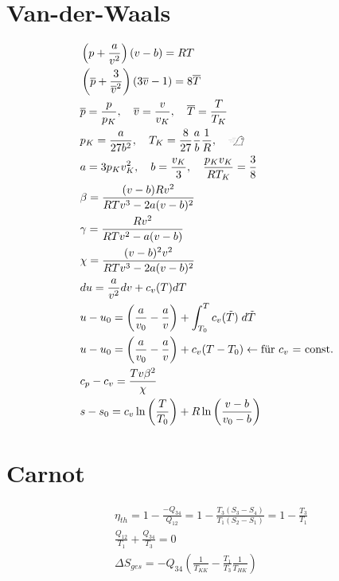 \documentclass[twocolumn]{article}
\begin{document}
\section{Van-der-Waals}
\begin{align*}
	&\left(p + \frac{a}{v^2}\right)(v-b) = RT \\
	&\left(\overline{p} + \frac{3}{\overline{v}^2}\right)(3\overline{v}-1) = 8\overline{T} \\
	&\overline{p} = \frac{p}{p_K}, \quad \overline{v} = \frac{v}{v_K}, \quad \overline{T} = \frac{T}{T_K} \\
	&p_K = \frac{a}{27b^2}, \quad T_K = \frac{8}{27}\frac{a}{b}\frac{1}{R}, \quad \xrightswishingghost{} \\
	&a=3p_Kv^2_K, \quad b =\frac{v_K}{3}, \quad \frac{p_Kv_K}{RT_K} = \frac{3}{8} \\
	&\beta = \frac{(v-b)Rv^2}{RTv^3 - 2a(v-b)^2} \\ 
	&\gamma = \frac{Rv^2}{RTv^2 - a(v-b)} \\
	&\chi = \frac{(v-b)^2v^2}{RTv^3 - 2a(v-b)^2} \\
	& du = \frac{a}{v^2}dv + c_v(T)dT \\
	&u-u_0 = \left( \frac{a}{v_0} - \frac{a}{v} \right) + \int_{T_0}^{T} c_v(\tilde{T})\; d\tilde{T} \\
	& u - u_0 = \left(\frac{a}{v_0} - \frac{a}{v} \right) + c_v(T-T_0) \leftarrow \text{für $c_v$ = const.} \\
	&c_p - c_v = \frac{Tv\beta^2}{\chi} \\
	& s- s_0 = c_v \ln \left( \frac{T}{T_0} \right) + R \ln \left(\frac{v-b}{v_0 - b} \right)
\end{align*}

\section{Carnot}

\begin{align*}
	&\eta_{th} = 1 - \frac{-Q_{34}}{Q_{12}} = 1 - \frac{T_3(S_3-S_4)}{T_1(S_2 - S_1)} = 1 - \frac{T_3}{T_1} \\
	&\frac{Q_{12}}{T_1} + \frac{Q_{34}}{T_3} = 0 \\
	&\Delta S_{ges} = -Q_{34} \left( \frac{1}{T_{KK}} - \frac{T_1}{T_3}\frac{1}{T_{HK}} \right)
\end{align*}
\end{document}
